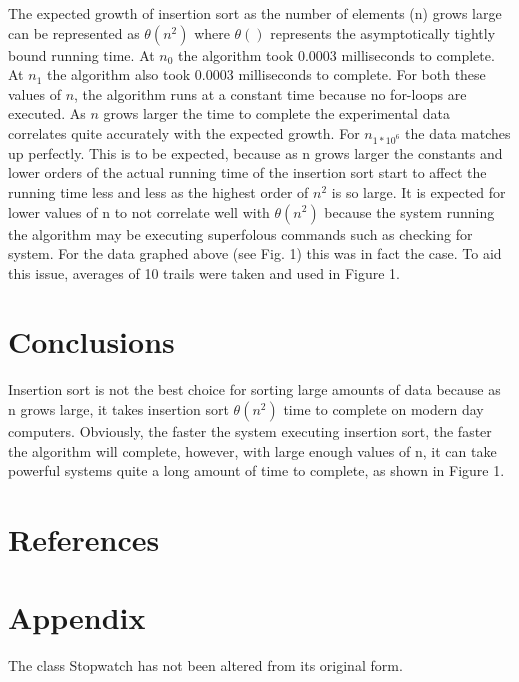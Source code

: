 \documentclass[onecolumn, 12pt, article]{IEEEtran}
\numberwithin{case}{problem}
\numberwithin{condition}{problem}
\numberwithin{condition}{subsection}
\numberwithin{definition}{section}
\theoremstyle{remark}
\numberwithin{question}{problem}
\theoremstyle{plain}
\numberwithin{answer}{problem}
\numberwithin{solution}{section}
\numberwithin{equation}{section}%
\begin{document}
The expected growth of insertion sort as the number of elements (n) grows large can be represented as $ \theta(n^2) $ where $ \theta() $ represents the asymptotically tightly bound running time. At $n_0$ the algorithm took 0.0003 milliseconds to complete. At $n_1$ the algorithm also took 0.0003 milliseconds to complete. For both these values of $n$, the algorithm runs at a constant time because no for-loops are executed. As $n$ grows larger the time to complete the experimental data correlates quite accurately with the expected growth. For $n_{1*10^6} $ the data matches up perfectly. This is to be expected, because as n grows larger the constants and lower orders of the actual running time of the insertion sort start to affect the running time less and less as the highest order of $n^2$ is so large. It is expected for lower values of n to not correlate well with $ \theta(n^2) $ because the system running the algorithm may be executing superfolous commands such as checking for system. For the data graphed above (see Fig. 1) this was in fact the case. To aid this issue, averages of 10 trails were taken and used in Figure 1.

\section{Conclusions}
Insertion sort is not the best choice for sorting large amounts of data because as n grows large, it takes insertion sort $ \theta(n^2) $ time to complete on modern day computers. Obviously, the faster the system executing insertion sort, the faster the algorithm will complete, however, with large enough values of n, it can take powerful systems quite a long amount of time to complete, as shown in Figure 1. 



\newpage

\section*{References}



\newpage

\section*{Appendix}




The class Stopwatch has not been altered from its original form.
\newline



\end{document}
